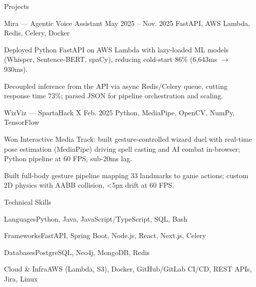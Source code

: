 \documentclass[
	11pt
]{../../../resume}
\begin{document}
	\begin{rSection}{P}{rojects}
		\begin{rSectionEntry}
			{Mira --- Agentic Voice Assistant}
			{May 2025 -- Nov. 2025}
			{}
			{FastAPI, AWS Lambda, Redis, Celery, Docker}
			{}

			\item Deployed Python FastAPI on AWS Lambda with lazy-loaded ML models (Whisper, Sentence-BERT, spaCy), reducing cold-start 86\% (6{,}643ms $\rightarrow$ 930ms).
			\item Decoupled inference from the API via async Redis/Celery queue, cutting response time 73\%; parsed JSON for pipeline orchestration and scaling.
		\end{rSectionEntry}

		\begin{rSectionEntry}
			{WizViz --- SpartaHack X}
			{Feb. 2025}
			{}
			{Python, MediaPipe, OpenCV, NumPy, TensorFlow}
			{}

			\item Won Interactive Media Track: built gesture-controlled wizard duel with real-time pose estimation (MediaPipe) driving spell casting and AI combat in-browser; Python pipeline at 60 FPS, sub-20ms lag.
			\item Built full-body gesture pipeline mapping 33 landmarks to game actions; custom 2D physics with AABB collision, \textless5px drift at 60 FPS.
		\end{rSectionEntry}
	\end{rSection}

	\begin{rSection}{T}{echnical Skills}
		\begin{rSet}{Languages}{Python, Java, JavaScript/TypeScript, SQL, Bash}
		\end{rSet}
		\begin{rSet}{Frameworks}{FastAPI, Spring Boot, Node.js, React, Next.js, Celery}
		\end{rSet}
		\begin{rSet}{Databases}{PostgreSQL, Neo4j, MongoDB, Redis}
		\end{rSet}
		\begin{rSet}{Cloud \& Infra}{AWS (Lambda, S3), Docker, GitHub/GitLab CI/CD, REST APIs, Jira, Linux}
		\end{rSet}
	\end{rSection}
\end{document}
